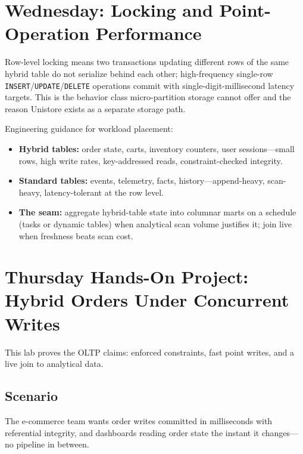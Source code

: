 \section{Wednesday: Locking and Point-Operation Performance}
Row-level locking means two transactions updating different rows of the same hybrid table do not serialize behind each other; high-frequency single-row \texttt{INSERT}/\texttt{UPDATE}/\texttt{DELETE} operations commit with single-digit-millisecond latency targets. This is the behavior class micro-partition storage cannot offer and the reason Unistore exists as a separate storage path.

Engineering guidance for workload placement:
\begin{itemize}
    \item \textbf{Hybrid tables:} order state, carts, inventory counters, user sessions---small rows, high write rates, key-addressed reads, constraint-checked integrity.
    \item \textbf{Standard tables:} events, telemetry, facts, history---append-heavy, scan-heavy, latency-tolerant at the row level.
    \item \textbf{The seam:} aggregate hybrid-table state into columnar marts on a schedule (tasks or dynamic tables) when analytical scan volume justifies it; join live when freshness beats scan cost.
\end{itemize}

\section{Thursday Hands-On Project: Hybrid Orders Under Concurrent Writes}
This lab proves the OLTP claims: enforced constraints, fast point writes, and a live join to analytical data.

\subsection*{Scenario}
The e-commerce team wants order writes committed in milliseconds with referential integrity, and dashboards reading order state the instant it changes---no pipeline in between.

